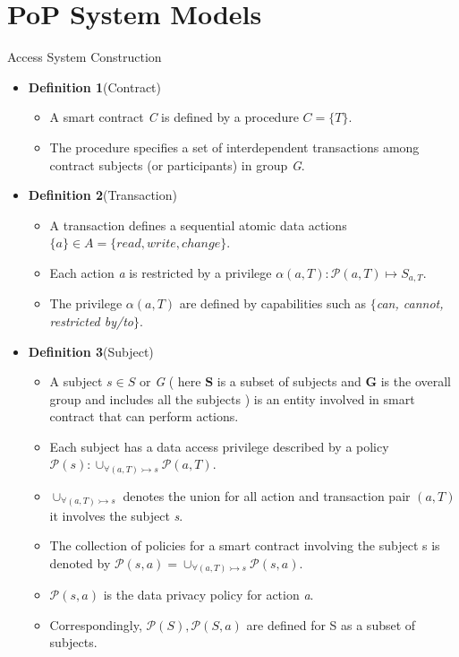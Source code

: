 \documentclass[11pt]{beamer}
\begin{document}
\section{PoP System Models}
\begin{frame}[allowframebreaks]{Access System Construction}
\begin{itemize}
\item \textbf{Definition 1}(Contract)
	\begin{itemize}
	\item A smart contract \textit{C} is defined by a procedure $C = \{T\}$.
	\item The procedure specifies a set of interdependent transactions among contract subjects (or participants) in group \textit{G}.
	\end{itemize}
\item \textbf{Definition 2}(Transaction)
	\begin{itemize}
	\item A transaction defines a sequential atomic data actions $\{a\} \in A = \{\mathit{read,write,change}\}$.
	\item Each action \textit{a} is restricted by a privilege $\alpha(a,T): \mathcal{P}(a,T) \longmapsto S_{a,T}$.
	\item The privilege $\alpha(a, T)$ are defined by capabilities such as $\{$\textit{can, cannot, restricted by/to}$\}$.
	\end{itemize}
\break
\item \textbf{Definition 3}(Subject)
	\begin{itemize}
	\item A subject $s \in S$ or \textit{G} ( here \textbf{S} is a subset of subjects and \textbf{G} is the overall group and includes all the subjects ) is an entity involved in smart contract that can perform actions.
	\item Each subject has a data access privilege described by a policy $\mathcal{P}(s): \cup_{\forall(a, T) \rightarrowtail s} \mathcal{P}(a, T)$.
	\item $\cup_{\forall(a, T) \rightarrowtail s}$ denotes the union for all action and transaction pair $(a, T)$ it involves the subject \textit{s}.
	\item The collection of policies for a smart contract involving the subject s is denoted by $\mathcal{P}(s, a) = \cup_{\forall(a, T) \rightarrowtail s} \mathcal{P}(s, a)$.
	\item $\mathcal{P}(s, a)$ is the data privacy policy for action \textit{a}.
	\item Correspondingly, $\mathcal{P}(S), \mathcal{P}(S, a)$ are defined for S as a subset of subjects.

\end{itemize}
\end{itemize}
\end{frame}
\end{document}
